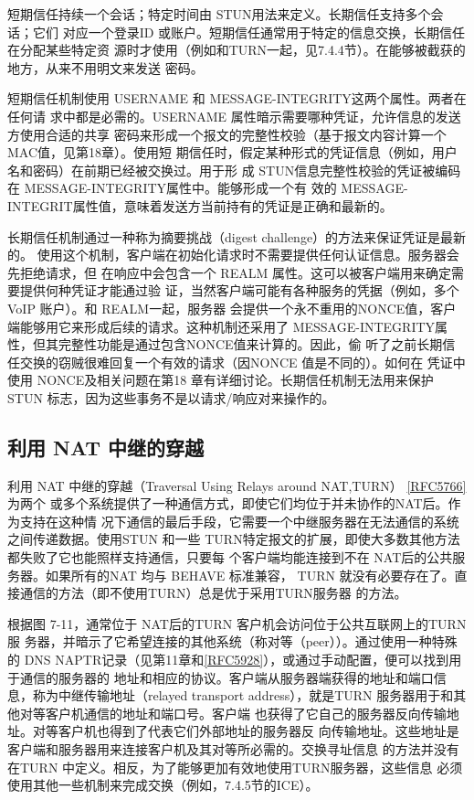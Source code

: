 短期信任持续一个会话；特定时间由 STUN用法来定义。长期信任支持多个会话；它们
对应一个登录ID 或账户。短期信任通常用于特定的信息交换，长期信任在分配某些特定资
源时才使用（例如和TURN一起，见7.4.4节）。在能够被截获的地方，从来不用明文来发送
密码。

短期信任机制使用 USERNAME 和 MESSAGE-INTEGRITY这两个属性。两者在任何请
求中都是必需的。USERNAME 属性暗示需要哪种凭证，允许信息的发送方使用合适的共享
密码来形成一个报文的完整性校验（基于报文内容计算一个MAC值，见第18章）。使用短
期信任时，假定某种形式的凭证信息（例如，用户名和密码）在前期已经被交换过。用于形
成 STUN信息完整性校验的凭证被编码在 MESSAGE-INTEGRITY属性中。能够形成一个有
效的 MESSAGE-INTEGRIT属性值，意味着发送方当前持有的凭证是正确和最新的。

长期信任机制通过一种称为摘要挑战（digest challenge）的方法来保证凭证是最新的。
使用这个机制，客户端在初始化请求时不需要提供任何认证信息。服务器会先拒绝请求，但
在响应中会包含一个 REALM 属性。这可以被客户端用来确定需要提供何种凭证才能通过验
证，当然客户端可能有各种服务的凭据（例如，多个 VoIP 账户）。和 REALM一起，服务器
会提供一个永不重用的NONCE值，客户端能够用它来形成后续的请求。这种机制还采用了
MESSAGE-INTEGRITY属性，但其完整性功能是通过包含NONCE值来计算的。因此，偷
听了之前长期信任交换的窃贼很难回复一个有效的请求（因NONCE 值是不同的）。如何在
凭证中使用 NONCE及相关问题在第18 章有详细讨论。长期信任机制无法用来保护 STUN
标志，因为这些事务不是以请求/响应对来操作的。

\subsection{利用 NAT 中继的穿越}

利用 NAT 中继的穿越（Traversal Using Relays around NAT,TURN） \href{https://www.rfc-editor.org/rfc/rfc5766}{[RFC5766]}为两个
或多个系统提供了一种通信方式，即使它们均位于并未协作的NAT后。作为支持在这种情
况下通信的最后手段，它需要一个中继服务器在无法通信的系统之间传递数据。使用STUN
和一些 TURN特定报文的扩展，即使大多数其他方法都失败了它也能照样支持通信，只要每
个客户端均能连接到不在 NAT后的公共服务器。如果所有的NAT 均与 BEHAVE 标准兼容，
TURN 就没有必要存在了。直接通信的方法（即不使用TURN）总是优于采用TURN服务器
的方法。

根据图 7-11，通常位于 NAT后的TURN 客户机会访问位于公共互联网上的TURN服
务器，并暗示了它希望连接的其他系统（称对等（peer））。通过使用一种特殊的 DNS
NAPTR记录（见第11章和\href{https://www.rfc-editor.org/rfc/rfc5928}{[RFC5928]}），或通过手动配置，便可以找到用于通信的服务器的
地址和相应的协议。客户端从服务器端获得的地址和端口信息，称为中继传输地址（relayed
transport address），就是TURN 服务器用于和其他对等客户机通信的地址和端口号。客户端
也获得了它自己的服务器反向传输地址。对等客户机也得到了代表它们外部地址的服务器反
向传输地址。这些地址是客户端和服务器用来连接客户机及其对等所必需的。交换寻址信息
的方法并没有在TURN 中定义。相反，为了能够更加有效地使用TURN服务器，这些信息
必须使用其他一些机制来完成交换（例如，7.4.5节的ICE）。

